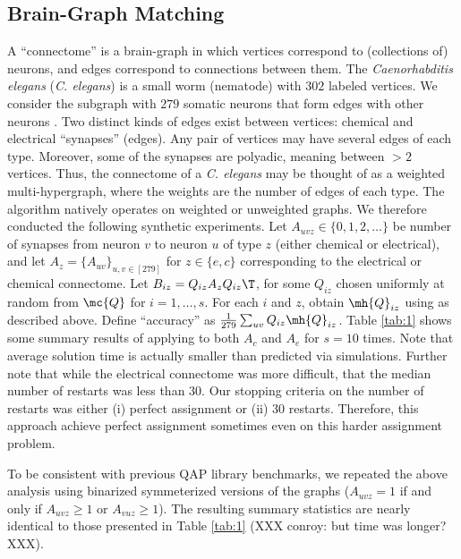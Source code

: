 \documentclass[10pt,journal,cspaper,compsoc]{IEEEtran}
\begin{document}


\subsection{Brain-Graph Matching} %
\label{sub:connectome_classification}

A ``connectome'' is a brain-graph in which vertices correspond to (collections of) neurons, and edges correspond to connections between them. The \emph{Caenorhabditis elegans} (\emph{C. elegans}) is a small worm (nematode) with $302$ labeled vertices.  We consider the subgraph with $279$ somatic neurons that form edges with other neurons \cite{WhiteBrenner86, Varshney2011}.  Two distinct kinds of edges exist between vertices: chemical and electrical ``synapses'' (edges). Any pair of vertices may have several edges of each type. Moreover, some of the synapses are polyadic, meaning between $>2$ vertices.    Thus, the connectome of a \emph{C. elegans} may be thought of as a weighted multi-hypergraph, where the weights are the number of edges of each type.  The \qapm algorithm natively operates on weighted or unweighted graphs.  We therefore conducted the following synthetic experiments.  Let $A_{uvz} \in \{0,1,2,\ldots\}$ be number of synapses from neuron $v$ to neuron $u$ of type $z$ (either chemical or electrical), and let $A_z=\{A_{uv}\}_{u,v \in [279]}$ for $z \in \{e,c\}$ corresponding to the electrical or chemical connectome.  Let $B_{iz}=Q_{iz} A_z Q_{iz}\T$, for some $Q_{iz}$ chosen uniformly at random from $\mc{Q}$ for $i=1,\ldots,s$.  For each $i$ and $z$, obtain $\mh{Q}_{iz}$ using \qapm as described above.  Define ``accuracy'' as $\frac{1}{279}\sum_{uv} Q_{iz} \mh{Q}_{iz}$.  Table \ref{tab:1} shows some summary results of applying \qapm to both $A_c$ and $A_e$ for $s=10$ times.  Note that average solution time is actually smaller than predicted via simulations.  Further note that while the electrical connectome was more difficult, that the median number of restarts was less than $30$.  Our stopping criteria on the number of restarts was either (i) perfect assignment or (ii) 30 restarts.  Therefore, this approach achieve perfect assignment sometimes even on this harder assignment problem.

To be consistent with previous QAP library benchmarks, we repeated the above analysis using binarized symmeterized versions of the graphs ($A_{uvz}=1$ if and only if $A_{uvz}\geq 1$ or $A_{vuz} \geq 1$).  The resulting summary statistics are nearly identical to those presented in Table \ref{tab:1} (XXX conroy: but time was longer? XXX).
\end{document}
